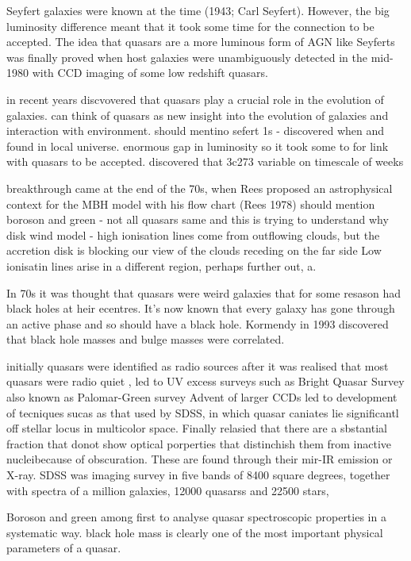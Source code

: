 Seyfert galaxies were known at the time (1943; Carl Seyfert). 
However, the big luminosity difference meant that it took some time for the connection to be accepted. 
The idea that quasars are a more luminous form of AGN like Seyferts was finally proved when host galaxies were unambiguously detected in the mid-1980 with CCD imaging of some low redshift quasars.





in recent years discvovered that quasars play a crucial role in the evolution of galaxies. can think of quasars as new insight into the evolution of galaxies and interaction with environment. 
should mentino sefert 1s - discovered when and found in local universe. enormous gap in luminosity so it took some to for link with quasars to be accepted. 
discovered that 3c273 variable on timescale of weeks 

breakthrough came at the end of the 70s, when Rees proposed an astrophysical context for the MBH model with his flow chart (Rees 1978)
should mention boroson and green - not all quasars same and this is trying to understand why 
disk wind model - high ionisation lines come from outflowing clouds, but the accretion disk is blocking our view of the clouds receding on the far side
Low ionisatin lines arise in a different region, perhaps further out, a. 

In 70s it was thought that quasars were weird galaxies that for some resason had black holes at heir ecentres. 
It's now known that every galaxy has gone through an active phase and so should have a black hole. 
Kormendy in 1993 discovered that black hole masses and bulge masses were correlated. 




initially quasars were identified as radio sources
after it was realised that most quasars were radio quiet , led to UV excess surveys such as Bright Quasar Survey also known as Palomar-Green survey
Advent of larger CCDs led to development of tecniques sucas as that used by SDSS, in which quasar caniates lie significantl off stellar locus in multicolor space. 
Finally relasied that there are a sbstantial fraction that donot show optical porperties that distinchish them from inactive nucleibecause of obscuration. 
These are found through their mir-IR emission or X-ray. 
SDSS was imaging survey in five bands of 8400 square degrees, together with spectra of a million galaxies, 12000 quasarss and 22500 stars, 

Boroson and green among first to analyse quasar spectroscopic properties in a systematic way.
black hole mass is clearly one of the most important physical parameters of a quasar. 

